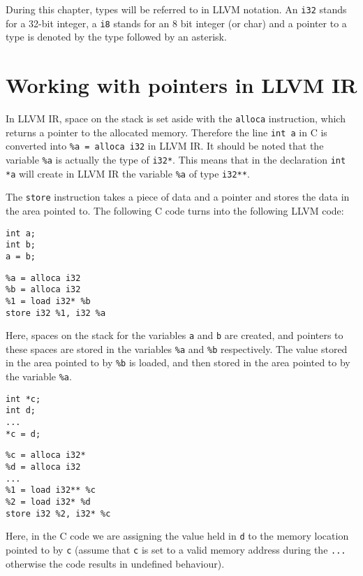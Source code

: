 During this chapter, types will be referred to in LLVM notation.
An \verb!i32! stands for a 32-bit integer, a \verb!i8! stands for an 8 bit integer (or char) and a pointer to a type is denoted by the type followed by an asterisk.

\section{Working with pointers in LLVM IR}

In LLVM IR, space on the stack is set aside with the \verb!alloca! instruction, which returns a pointer to the allocated memory.
Therefore the line \verb!int a! in C is converted into \verb!%a = alloca i32! in LLVM IR.
It should be noted that the variable \verb!%a! is actually the type of \verb!i32*!.
This means that in the declaration \verb!int *a! will create in LLVM IR the variable \verb!%a! of type \verb!i32**!.

The \verb!store! instruction takes a piece of data and a pointer and stores the data in the area pointed to.
The following C code turns into the following LLVM code:

\begin{verbatim}
int a;
int b;
a = b;
\end{verbatim}

\begin{verbatim}
%a = alloca i32
%b = alloca i32
%1 = load i32* %b
store i32 %1, i32 %a
\end{verbatim}

Here, spaces on the stack for the variables \verb!a! and \verb!b! are created, and pointers to these spaces are stored in the variables \verb!%a! and \verb!%b! respectively.
The value stored in the area pointed to by \verb!%b! is loaded, and then stored in the area pointed to by the variable \verb!%a!.

\begin{verbatim}
int *c;
int d;
...
*c = d;
\end{verbatim}

\begin{verbatim}
%c = alloca i32*
%d = alloca i32
...
%1 = load i32** %c
%2 = load i32* %d
store i32 %2, i32* %c
\end{verbatim}

Here, in the C code we are assigning the value held in \verb!d! to the memory location pointed to by \verb!c! (assume that \verb!c! is set to a valid memory address during the \verb!...! otherwise the code results in undefined behaviour).

